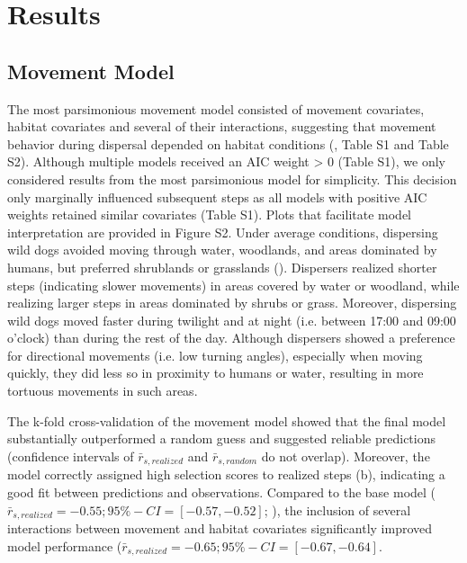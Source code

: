 \documentclass[abstract=on,10pt,a4paper,bibliography=totocnumbered]{article}
\begin{document}
\section{Results}
\subsection{Movement Model}
The most parsimonious movement model consisted of movement covariates, habitat
covariates and several of their interactions, suggesting that movement behavior
during dispersal depended on habitat conditions (, Table S1
and Table S2). Although multiple models received an AIC weight > 0 (Table S1),
we only considered results from the most parsimonious model for simplicity. This
decision only marginally influenced subsequent steps as all models with positive
AIC weights retained similar covariates (Table S1). Plots that facilitate model
interpretation are provided in Figure S2. Under average conditions, dispersing
wild dogs avoided moving through water, woodlands, and areas dominated by
humans, but preferred shrublands or grasslands ().
Dispersers realized shorter steps (indicating slower movements) in areas covered
by water or woodland, while realizing larger steps in areas dominated by shrubs
or grass. Moreover, dispersing wild dogs moved faster during twilight and at
night (i.e. between 17:00 and 09:00 o'clock) than during the rest of the day.
Although dispersers showed a preference for directional movements (i.e. low
turning angles), especially when moving quickly, they did less so in proximity
to humans or water, resulting in more tortuous movements in such areas.

The k-fold cross-validation of the movement model showed that the final model
substantially outperformed a random guess and suggested reliable predictions
(confidence intervals of \(\bar{r}_{s, realized}\) and \(\bar{r}_{s, random}\)
do not overlap). Moreover, the model correctly assigned high selection scores to
realized steps (b), indicating a good fit between
predictions and observations. Compared to the base model (\(\bar{r}_{s,
realized} = -0.55; 95\%-CI = [-0.57, -0.52]\); \citealp{Hofmann.2021}), the
inclusion of several interactions between movement and habitat covariates
significantly improved model performance (\(\bar{r}_{s, realized} = -0.65;
95\%-CI = [-0.67, -0.64]\).
\end{document}
